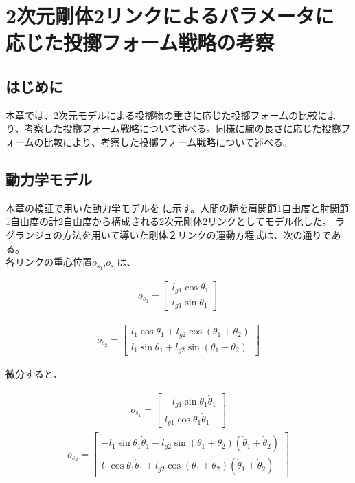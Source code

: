 \chapter[2次元剛体2リンクによるパラメータに応じた投擲フォーム戦略の考察]{2次元剛体2リンクによるパラメータに応じた投擲フォーム戦略の考察}

\section{はじめに}
本章では、2次元モデルによる投擲物の重さに応じた投擲フォームの比較により、考察した投擲フォーム戦略について述べる。同様に腕の長さに応じた投擲フォームの比較により、考察した投擲フォーム戦略について述べる。
\section{動力学モデル}
本章の検証で用いた動力学モデルを
に示す。人間の腕を肩関節1自由度と肘関節1自由度の計2自由度から構成される2次元剛体2リンクとしてモデル化した。
ラグランジュの方法を用いて導いた剛体２リンクの運動方程式は、次の通りである。\\
各リンクの重心位置$o_{s_{1}}$,$o_{s_{1}}$は、

\begin{eqnarray}
  o_{s_{1}} = 
              \begin{bmatrix}
              l_{g1}\cos\theta_{1}\\
              l_{g1}\sin\theta_{1}
              \end{bmatrix}
\end{eqnarray}

\begin{eqnarray}
  o_{s_{2}} = 
              \begin{bmatrix}
              l_{1}\cos\theta_{1} + l_{g2}\cos(\theta_{1} + \theta_{2})\\
              l_{1}\sin\theta_{1} + l_{g2}\sin(\theta_{1} + \theta_{2})
              \end{bmatrix}
\end{eqnarray}

微分すると、

\begin{eqnarray}
  o_{\dot{s}_{1}} = 
              \begin{bmatrix}
              -l_{g1}\sin\theta_{1}\dot{\theta}_{1}\\
              l_{g1}\cos\theta_{1}\dot{\theta}_{1}
              \end{bmatrix}
\end{eqnarray}
\begin{eqnarray}
  o_{\dot{s}_{2}} = 
              \begin{bmatrix}
                -l_{1}\sin\theta_{1}\dot{\theta}_{1} - l_{g2}\sin(\theta_{1} + \theta_{2})(\dot{\theta}_{1} + \dot{\theta}_{2})\\
                l_{1}\cos\theta_{1}\dot{\theta}_{1} + l_{g2}\cos(\theta_{1} + \theta_{2})(\dot{\theta}_{1} + \dot{\theta}_{2})
              \end{bmatrix}
\end{eqnarray}

